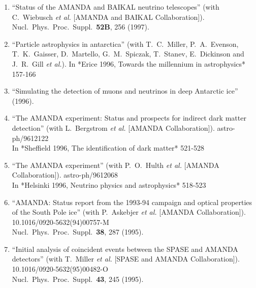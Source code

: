 \begin{enumerate}
\item ``Status of the AMANDA and BAIKAL neutrino telescopes'' (with C.~Wiebusch {\it et al.}  [AMANDA and BAIKAL Collaboration]). Nucl.\ Phys.\ Proc.\ Suppl.\  {\bf 52B}, 256 (1997). %


\item ``Particle astrophysics in antarctica'' (with T.~C.~Miller, P.~A.~Evenson, T.~K.~Gaisser, D.~Martello, G.~M.~Spiczak, T.~Stanev, E.~Dickinson and J.~R.~Gill {\it et al.}). In *Erice 1996, Towards the millennium in astrophysics* 157-166 %


\item ``Simulating the detection of muons and neutrinos in deep Antarctic ice'' (1996).


\item ``The AMANDA experiment: Status and prospects for indirect dark matter detection'' (with L.~Bergstrom {\it et al.}  [AMANDA Collaboration]). astro-ph/9612122
\\{}In *Sheffield 1996, The identification of dark matter* 521-528 %


\item ``The AMANDA experiment'' (with P.~O.~Hulth {\it et al.}  [AMANDA Collaboration]). astro-ph/9612068
\\{}In *Helsinki 1996, Neutrino physics and astrophysics* 518-523 %


\item ``AMANDA: Status report from the 1993-94 campaign and optical properties of the South Pole ice'' (with P.~Askebjer {\it et al.}  [AMANDA Collaboration]). 10.1016/0920-5632(94)00757-M
\\{}Nucl.\ Phys.\ Proc.\ Suppl.\  {\bf 38}, 287 (1995). %


\item ``Initial analysis of coincident events between the SPASE and AMANDA detectors'' (with T.~Miller {\it et al.}  [SPASE and AMANDA Collaboration]). 10.1016/0920-5632(95)00482-O
\\{}Nucl.\ Phys.\ Proc.\ Suppl.\  {\bf 43}, 245 (1995). %



\end{enumerate}
